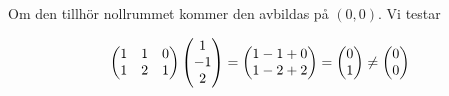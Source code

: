 \documentclass[../../main.tex]{subfiles}
\begin{document}
\begin{solution}{14}

Om den tillhör nollrummet kommer den avbildas på $(0,0)$. Vi testar

$$
\begin{pmatrix}
1&1&0\\
1&2&1
\end{pmatrix} \begin{pmatrix}1\\-1\\2\end{pmatrix} =
\begin{pmatrix}1-1+0\\1-2+2\end{pmatrix} = \begin{pmatrix}0\\1\end{pmatrix} \neq \begin{pmatrix}0\\0\end{pmatrix}
$$


\end{solution}
\end{document}
